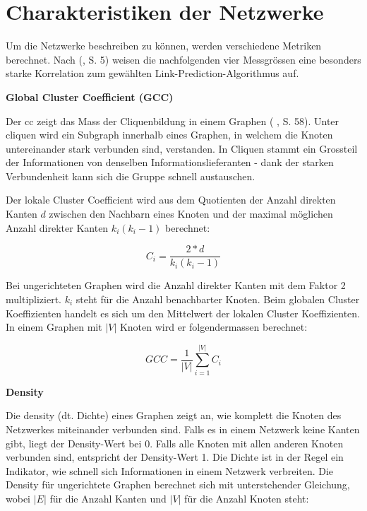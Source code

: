 \section{Charakteristiken der Netzwerke}
Um die Netzwerke beschreiben zu können, werden verschiedene Metriken berechnet.
Nach \citeauthor{gao_link_2015} (\citeyear{gao_link_2015}, S. 5) weisen die nachfolgenden vier Messgrössen eine besonders starke Korrelation zum gewählten Link-Prediction-Algorithmus auf.

\textbf{Global Cluster Coefficient (GCC)}

Der \acs{cc} zeigt das Mass der Cliquenbildung in einem Graphen (\citeauthor{michael_henninger_soziale_2018} \citeyear{michael_henninger_soziale_2018}, S. 58).
Unter \acs{clique}n wird ein Subgraph innerhalb eines Graphen, in welchem die Knoten untereinander stark verbunden sind, verstanden.
In Cliquen stammt ein Grossteil der Informationen von denselben Informationslieferanten - dank der starken Verbundenheit kann sich die Gruppe schnell austauschen.

Der lokale Cluster Coefficient wird aus dem Quotienten der Anzahl direkten Kanten $d$ zwischen den Nachbarn eines Knoten und der maximal möglichen Anzahl direkter Kanten $k_i(k_i -1)$ berechnet:

\begin{equation}
    \label{eq:ci}
    C_i = \frac{2*d}{k_i(k_i-1)}
\end{equation}

Bei ungerichteten Graphen wird die Anzahl direkter Kanten mit dem Faktor 2 multipliziert. $k_i$ steht für die Anzahl benachbarter Knoten.
Beim globalen Cluster Koeffizienten handelt es sich um den Mittelwert der lokalen Cluster Koeffizienten.
In einem Graphen mit $|V|$ Knoten wird er folgendermassen berechnet:

\begin{equation}
    \label{eq:gcc}
    GCC = \frac{1}{|V|}\sum\limits_{i=1}^{|V|}C_i
\end{equation}

\textbf{Density}

Die \acs{density} (dt. Dichte) eines Graphen zeigt an, wie komplett die Knoten des Netzwerkes miteinander verbunden sind.
Falls es in einem Netzwerk keine Kanten gibt, liegt der Density-Wert bei 0. Falls alle Knoten mit allen anderen Knoten verbunden sind, entspricht der Density-Wert 1.
Die Dichte ist in der Regel ein Indikator, wie schnell sich Informationen in einem Netzwerk verbreiten.
Die Density für ungerichtete Graphen berechnet sich mit unterstehender Gleichung, wobei $|E|$ für die Anzahl Kanten und $|V|$ für die Anzahl Knoten steht:

